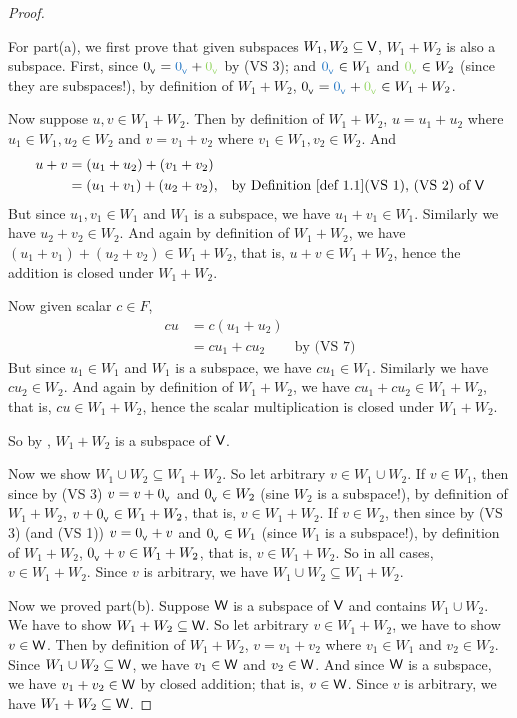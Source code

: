 \begin{proof}\ 

For part(a), we first prove that given subspaces \(W_1, W_2 \subseteq \textsf{V}\), \(W_1 + W_2\) is also a subspace.
First, since \(\OV = \BLUE{\OV} + \GREEN{\OV}\) by (VS 3);
and \(\BLUE{\OV} \in W_1\) and \(\GREEN{\OV} \in W_2\) (since they are subspaces!), by definition of \(W_1 + W_2\), \(\OV = \BLUE{\OV} + \GREEN{\OV} \in W_1 + W_2\).

Now suppose \(u, v \in W_1 + W_2\).
Then by definition of \(W_1 + W_2\), \(u = u_1 + u_2\) where \(u_1 \in W_1, u_2 \in W_2\) and \(v = v_1 + v_2\) where \(v_1 \in W_1, v_2 \in W_2\).
And
\begin{align*}
    u + v & = (u_1 + u_2) + (v_1 + v_2) \\
          & = (u_1 + v_1) + (u_2 + v_2), & \text{by \DEF{1.1}(VS 1), (VS 2) of \(\V\)}
\end{align*}
But since \(u_1, v_1 \in W_1\) and \(W_1\) is a subspace, we have \(u_1 + v_1 \in W_1\).
Similarly we have \(u_2 + v_2 \in W_2\).
And again by definition of \(W_1 + W_2\), we have \((u_1 + v_1) + (u_2 + v_2) \in W_1 + W_2\), that is, \(u + v \in W_1 + W_2\), hence the addition is closed under \(W_1 + W_2\).

Now given scalar \(c \in F\),
\begin{align*}
    c u & = c(u_1 + u_2) \\
        & = c u_1 + c u_2 & \text{by (VS 7)}
\end{align*}
But since \(u_1 \in W_1\) and \(W_1\) is a subspace, we have \(c u_1 \in W_1\).
Similarly we have \(c u_2 \in W_2\).
And again by definition of \(W_1 + W_2\), we have \(c u_1 + c u_2 \in W_1 + W_2\), that is, \(c u \in W_1 + W_2\), hence the scalar multiplication is closed under \(W_1 + W_2\).

So by , \(W_1 + W_2\) is a subspace of \(\textsf{V}\).

Now we show \(W_1 \cup W_2 \subseteq W_1 + W_2\).
So let arbitrary \(v \in W_1 \cup W_2\).
If \(v \in W_1\), then since by (VS 3) \(v = v + 0_{_{\textsf{V}}}\) and \(0_{_{\textsf{V}}} \in W_2\) (sine \(W_2\) is a subspace!), by definition of \(W_1 + W_2\), \(v + 0_{_{\textsf{V}}} \in W_1 + W_2\), that is, \(v \in W_1 + W_2\).
If \(v \in W_2\), then since by (VS 3) (and (VS 1)) \(v = 0_{_{\textsf{V}}} + v\) and \(0_{_{\textsf{V}}} \in W_1\) (since \(W_1\) is a subspace!), by definition of \(W_1 + W_2\), \(0_{_{\textsf{V}}} + v \in W_1 + W_2\), that is, \(v \in W_1 + W_2\).
So in all cases, \(v \in W_1 + W_2\).
Since \(v\) is arbitrary, we have \(W_1 \cup W_2 \subseteq W_1 + W_2\).

Now we proved part(b).
Suppose \(\textsf{W}\) is a subspace of \(\textsf{V}\) and contains \(W_1 \cup W_2\).
We have to show \(W_1 + W_2 \subseteq \textsf{W}\).
So let arbitrary \(v \in W_1 + W_2\), we have to show \(v \in \textsf{W}\).
Then by definition of \(W_1 + W_2\), \(v = v_1 + v_2\) where \(v_1 \in W_1\) and \(v_2 \in W_2\).
Since \(W_1 \cup W_2 \subseteq \textsf{W}\), we have \(v_1 \in \textsf{W}\) and \(v_2 \in \textsf{W}\).
And since \(\textsf{W}\) is a subspace, we have \(v_1 + v_2 \in \textsf{W}\) by closed addition;
that is, \(v \in \textsf{W}\).
Since \(v\) is arbitrary, we have \(W_1 + W_2 \subseteq \textsf{W}\).
\end{proof}


